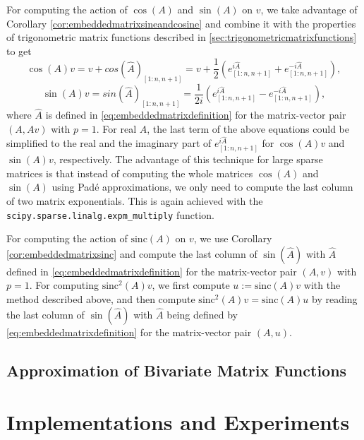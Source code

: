 For computing the action of $\cos(A)$ and $\sin(A)$ on $v$, we take advantage of Corollary
\ref{cor:embeddedmatrixsineandcosine} and combine it with the properties of trigonometric
matrix functions described in \autoref{sec:trigonometricmatrixfunctions} to get
\begin{equation*}
        \cos(A) v = v + cos(\hat{A})_{[1 : n, n+1]}
        = v + \frac{1}{2} (e^{i\hat{A}}_{[1 : n, n+1]} + e^{-i\hat{A}}_{[1 : n, n+1]}),
\end{equation*}
\begin{equation*}
        \sin(A) v = sin(\hat{A})_{[1 : n, n+1]}
        = \frac{1}{2i} (e^{i\hat{A}}_{[1 : n, n+1]} - e^{-i\hat{A}}_{[1 : n, n+1]}),
\end{equation*}
where $\hat{A}$ is defined in \eqref{eq:embeddedmatrixdefinition} for the matrix-vector
pair $(A, Av)$ with $p=1$.
For real $A$, the last term of the above equations could be simplified to the real and
the imaginary part of $e^{i\hat{A}}_{[1 : n, n+1]}$ for $\cos(A)v$ and $\sin(A)v$,
respectively.
The advantage of this technique for large sparse matrices is that instead of computing
the whole matrices $\cos(A)$ and $\sin(A)$ using Padé approximations, we only need to
compute the last column of two matrix exponentials. This is again achieved with the
\texttt{scipy.sparse.linalg.expm\_multiply} function.

For computing the action of $\mathrm{sinc}(A)$ on $v$, we use Corollary
\ref{cor:embeddedmatrixsinc} and compute the last column of $\sin(\hat{A})$ with
$\hat{A}$ defined in \eqref{eq:embeddedmatrixdefinition} for the matrix-vector
pair $(A, v)$ with $p=1$. For computing $\mathrm{sinc}^2(A) v$, we
first compute $u := \mathrm{sinc}(A)v$ with the method described above, and then
compute $\mathrm{sinc}^2(A) v = \mathrm{sinc}(A) u$ by reading the last column
of $\sin(\hat{A})$ with $\hat{A}$ being defined by
\eqref{eq:embeddedmatrixdefinition} for the matrix-vector pair $(A, u)$.

\subsection{Approximation of Bivariate Matrix Functions}
\label{sec:krylovmethodbivariate}


\section{Implementations and Experiments}

